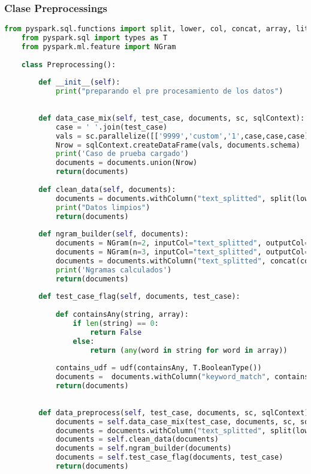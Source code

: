 \documentclass[12pt]{article}
\begin{document}
	\subsubsection*{ Clase Preprocessings}
	\begin{lstlisting}[language=Python, caption = Clase Preprocessings]
	from pyspark.sql.functions import split, lower, col, concat, array, lit, udf
	from pyspark.sql import types as T
	from pyspark.ml.feature import NGram
	
	class Preprocessing():
	    
	    def __init__(self):
	        print("preparando el pre procesamiento de los datos")
	        
	    
	    def data_case_mix(self, test_case, documents, sc, sqlContext):
	        case = ' '.join(test_case)
	        vals = sc.parallelize([['9999','custom','1',case,case,case]])
	        Nrow = sqlContext.createDataFrame(vals, documents.schema)
	        print('Caso de prueba cargado')
	        documents = documents.union(Nrow)
	        return(documents)
	    
	    def clean_data(self, documents):
	        documents = documents.withColumn("text_splitted", split(lower(col("articuloLimpio")), " "))
	        print("Datos limpios")
	        return(documents)
	    
	    def ngram_builder(self, documents):
	        documents = NGram(n=2, inputCol="text_splitted", outputCol="ngrams2").transform(documents)
	        documents = NGram(n=3, inputCol="text_splitted", outputCol="ngrams3").transform(documents)
	        documents = documents.withColumn("text_splitted", concat(col("text_splitted"),col("ngrams2"),col("ngrams3")))
	        print('Ngramas calculados')
	        return(documents)
	    
	    def test_case_flag(self, documents, test_case):
	        
	        def containsAny(string, array):
	            if len(string) == 0:
	                return False
	            else:
	                return (any(word in string for word in array))
	        
	        contains_udf = udf(containsAny, T.BooleanType())
	        documents =  documents.withColumn("keyword_match", contains_udf(col("text_splitted"), array([lit(i) for i in test_case])))
	        return(documents)
	    
	    
	    def data_preprocess(self, test_case, documents, sc, sqlContext):
	        documents = self.data_case_mix(test_case, documents, sc, sqlContext)
	        documents = documents.withColumn("text_splitted", split(lower(col("articuloLimpio")), " "))
	        documents = self.clean_data(documents)
	        documents = self.ngram_builder(documents)
	        documents = self.test_case_flag(documents, test_case)
	        return(documents)
	\end{lstlisting}
	
\end{document}
